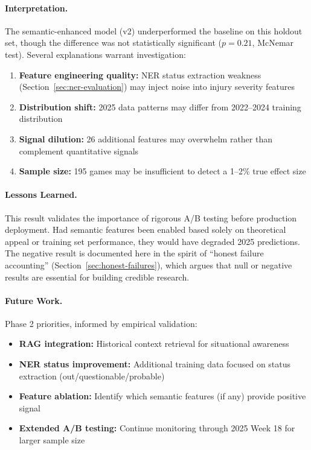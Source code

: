 \paragraph{Interpretation.}
The semantic-enhanced model (v2) underperformed the baseline on this holdout set, though the difference was not statistically significant ($p = 0.21$, McNemar test). Several explanations warrant investigation:

\begin{enumerate}[itemsep=2pt,parsep=0pt]
    \item \textbf{Feature engineering quality:} NER status extraction weakness (Section~\ref{sec:ner-evaluation}) may inject noise into injury severity features
    \item \textbf{Distribution shift:} 2025 data patterns may differ from 2022--2024 training distribution
    \item \textbf{Signal dilution:} 26 additional features may overwhelm rather than complement quantitative signals
    \item \textbf{Sample size:} 195 games may be insufficient to detect a 1--2\% true effect size
\end{enumerate}

\paragraph{Lessons Learned.}
This result validates the importance of rigorous A/B testing before production deployment. Had semantic features been enabled based solely on theoretical appeal or training set performance, they would have degraded 2025 predictions. The negative result is documented here in the spirit of ``honest failure accounting'' (Section~\ref{sec:honest-failures}), which argues that null or negative results are essential for building credible research.

\paragraph{Future Work.}
Phase 2 priorities, informed by empirical validation:
\begin{itemize}[itemsep=2pt,parsep=0pt]
    \item \textbf{RAG integration:} Historical context retrieval for situational awareness
    \item \textbf{NER status improvement:} Additional training data focused on status extraction (out/questionable/probable)
    \item \textbf{Feature ablation:} Identify which semantic features (if any) provide positive signal
    \item \textbf{Extended A/B testing:} Continue monitoring through 2025 Week 18 for larger sample size
\end{itemize}
